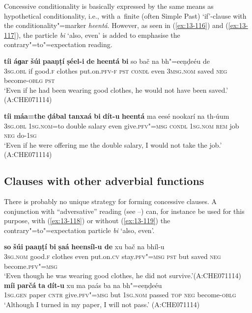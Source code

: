  Concessive conditionality is basically expressed by the same means as hypothetical conditionality, i.e., with a~finite (often Simple Past) `if'-clause with the conditionality"=marker \textit{heentá}. However, as seen in (\ref{ex:13-116}) and (\ref{ex:13-117}), the particle \textit{bi} `also, even' is added to emphasise the contrary"=to"=expectation reading. 
\largerpage
\begin{exe}
\ex
\label{ex:13-116}
\gll \textbf{tíi} \textbf{áɡar} \textbf{šúi} \textbf{paaṇṭí} \textbf{ṣéel-i} \textbf{de} \textbf{heentá} \textbf{ bi} so bač na bh"=eeṇḍeéu de  \\
\textsc{3sg.obl} if good.\textsc{f} clothes put.on.\textsc{pfv-f} \textsc{pst} \textsc{condl}  even \textsc{3msg.nom} saved \textsc{neg} become-\textsc{oblg} \textsc{pst} \\
\glt `Even if he had been wearing good clothes, he would not have been saved.' (A:CHE071114)

\ex
\label{ex:13-117}
\gll \textbf{tíi} \textbf{máa=the} \textbf{ḍábal} \textbf{tanxaá} \textbf{bi} \textbf{dít-u} \textbf{ heentá} ma eesé nookarí na th-úum \\
\textsc{3sg.obl} \textsc{1sg.nom}=to double salary even give.\textsc{pfv"=msg}  \textsc{condl } \textsc{1sg.nom} \textsc{rem} job \textsc{neg} do-\textsc{1sg} \\
\glt `Even if he were offering me the double salary, I would not take the job.' (A:CHE071114)
\end{exe}

\subsection{Clauses with other adverbial functions}
\label{subsec:13-4-5}

 There is probably no unique strategy for forming concessive clauses. A conjunction with ``adversative'' reading (see --) can, for instance be used for this purpose, with (\ref{ex:13-118}) or without (\ref{ex:13-119}) the contrary"=to"=expectation particle \textit{bi} `also, even'. 

\ea
\label{ex:13-118}
\gll \textbf{so} \textbf{šúi} \textbf{paaṇṭí} \textbf{bi} \textbf{ṣaá} \textbf{heensíl-u de} xu bač na bhíl-u\\
\textsc{3sg.nom} good.\textsc{f} clothes even put.on.\textsc{cv} stay.\textsc{pfv"=msg} \textsc{pst} but saved \textsc{neg} become.\textsc{pfv"=msg}\\
\glt `Even though he was wearing good clothes, he did not survive.'\newline (A:CHE071114)
\ex
\label{ex:13-119}
\gll \textbf{míi} \textbf{parčá} \textbf{ta} \textbf{dít-u} xu ma paás ba na bh"=eeṇḍeéu\\
\textsc{1sg.gen} paper \textsc{cntr} give.\textsc{pfv"=msg} but \textsc{1sg.nom} passed \textsc{top} \textsc{neg} become-\textsc{oblg}\\
\glt `Although I turned in my paper, I will not pass.' (A:CHE071114) 
\z

